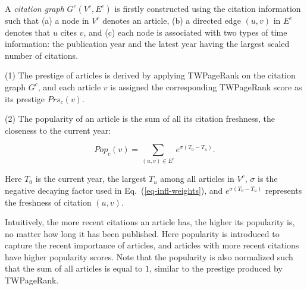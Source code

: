 A {\em citation graph} $G^c(V^c, E^c)$ is firstly constructed using the citation information such that (a) a node in $V^c$ denotes an article, (b) a directed edge $(u,v)$ in $E^c$ denotes that $u$ cites $v$, and (c) each node is associated with two types of time information: the publication year and the latest year having the largest scaled number of citations.


\sstab(1) The prestige of articles is derived by applying TWPageRank on the citation graph $G^c$, and each article $v$ is assigned the corresponding TWPageRank score as its prestige $Prs_c(v)$.

\sstab(2)  The popularity of an article is the sum of all its citation freshness, \ie the closeness to the current year:

\vspace{-1ex}
\begin{small}
\begin{equation}\label{eq-pop}
Pop_c(v) = \sum_{{(u,v)\in E^c}} {e^{\sigma (T_0-T_u)}}.
\end{equation}
\end{small}
\noindent
Here $T_0$ is the current year, \ie the largest $T_u$ among all articles in $V^c$, $\sigma$ is the negative decaying factor used in Eq.~(\ref{eq-infl-weights}), and $e^{\sigma (T_0-T_u)}$ represents the freshness of citation $(u,v)$.


Intuitively, the more recent citations an article has, the higher its popularity is, no matter how long it has been published.
Here popularity is introduced to capture the recent importance of articles, and articles with more recent citations have higher popularity scores. %
%
%
Note that the popularity is also normalized such that the sum of  all articles is equal to $1$, similar to the prestige produced by TWPageRank.

